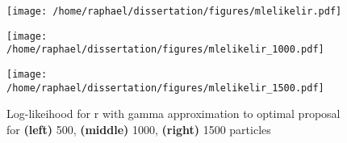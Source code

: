 \documentclass{article}
\begin{document}
	\begin{figure}[htb]
		\centering
		\begin{minipage}[t]{0.3\textwidth}
			\centering
			\texttt{[image: /home/raphael/dissertation/figures/mlelikelir.pdf]}
		\end{minipage}
		\begin{minipage}[t]{.3\textwidth}
			\centering
			\texttt{[image: /home/raphael/dissertation/figures/mlelikelir\_1000.pdf]}
		\end{minipage}
		\begin{minipage}[t]{0.3\textwidth}
			\centering
			\texttt{[image: /home/raphael/dissertation/figures/mlelikelir\_1500.pdf]}
		\end{minipage}
		\caption{Log-likeihood for r with gamma approximation to optimal proposal for \textbf{(left)} 500, \textbf{(middle)} 1000, \textbf{(right)} 1500 particles}
		\label{fig:likelir}
	\end{figure}
	
\end{document}
